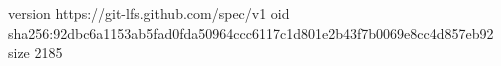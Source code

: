 version https://git-lfs.github.com/spec/v1
oid sha256:92dbc6a1153ab5fad0fda50964ccc6117c1d801e2b43f7b0069e8cc4d857eb92
size 2185
